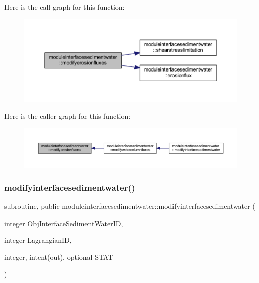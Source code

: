 Here is the call graph for this function\+:\nopagebreak
\begin{figure}[H]
\begin{center}
\leavevmode
\includegraphics[width=350pt]{namespacemoduleinterfacesedimentwater_a26bb67acd49cf811c778aa020cef0f2a_cgraph}
\end{center}
\end{figure}
Here is the caller graph for this function\+:\nopagebreak
\begin{figure}[H]
\begin{center}
\leavevmode
\includegraphics[width=350pt]{namespacemoduleinterfacesedimentwater_a26bb67acd49cf811c778aa020cef0f2a_icgraph}
\end{center}
\end{figure}
\mbox{\label{namespacemoduleinterfacesedimentwater_ac36014e82a94f1ba694775e21f24b005}} 
\subsubsection{\texorpdfstring{modifyinterfacesedimentwater()}{modifyinterfacesedimentwater()}}
{\footnotesize\ttfamily subroutine, public moduleinterfacesedimentwater\+::modifyinterfacesedimentwater (\begin{DoxyParamCaption}\item[{integer}]{Obj\+Interface\+Sediment\+Water\+ID,  }\item[{integer}]{Lagrangian\+ID,  }\item[{integer, intent(out), optional}]{S\+T\+AT }\end{DoxyParamCaption})}

